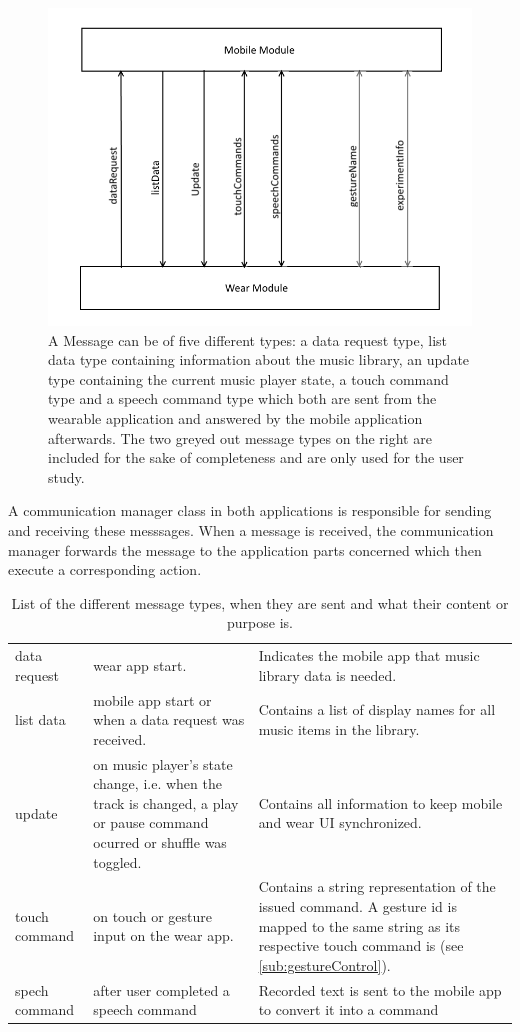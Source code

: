 \begin{figure}[bth]
	\myfloatalign
	\includegraphics[width=.7\linewidth]{img/CommunicationOverview.png}
	\caption{A Message can be of five different types: a data request type, list data type containing information about the music library, an update type containing the current music player state, a touch command type and a speech command type which both are sent from the wearable application and answered by the mobile application afterwards. The two greyed out message types on the right are included for the sake of completeness and are only used for the user study.}
	\label{fig:communicationoverview}
\end{figure}

A communication manager class in both applications is responsible for sending and receiving these messsages. When a message is received, the communication manager forwards the message to the application parts concerned which then execute a corresponding action.

\begin{table}[h]
	\myfloatalign
	\begin{tabularx}{\textwidth}{XXX} \toprule
		\tableheadline{Message Type} & \tableheadline{When Sent} & \tableheadline{Purpose} \\ 
		\midrule
		data request & wear app start. & Indicates the mobile app that music library data is needed. \\
		list data & mobile app start or when a data request was received. & Contains a list of display names for all music items in the library. \\
		update & on music player's state change, i.e. when the track is changed, a play or pause command ocurred or shuffle was toggled. & Contains all information to keep mobile and wear \ac{UI} synchronized. \\
		touch command & on touch or gesture input on the wear app. & Contains a string representation of the issued command. A gesture id is mapped to the same string as its respective touch command is (see \ref{sub:gestureControl}). \\
		spech command & after user completed a speech command & Recorded text is sent to the mobile app to convert it into a command \\
		\bottomrule
	\end{tabularx}
	\caption{List of the different message types, when they are sent and what their content or purpose is.}
	\label{tab:messageTypes}
\end{table}








